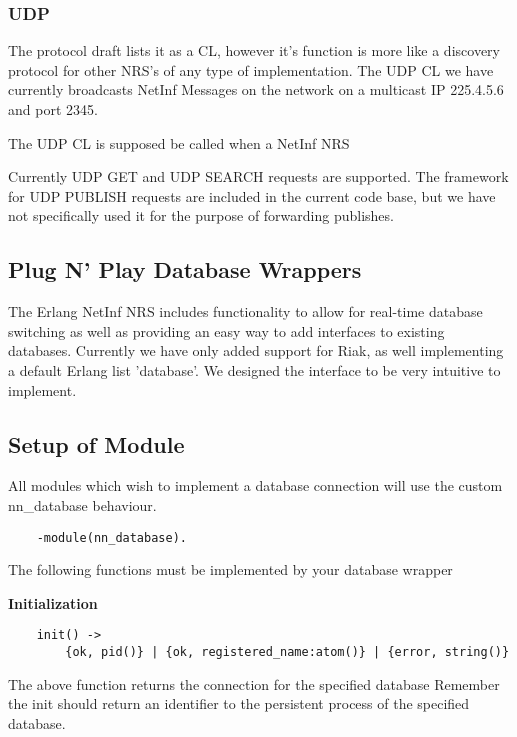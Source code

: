 \documentclass[11pt]{report}
\begin{document}
\subsubsection{UDP}

The protocol draft lists it as a CL, however it's function is more like a discovery protocol for other NRS's of any type of implementation. The UDP CL we have currently broadcasts NetInf Messages on the network on a multicast IP 225.4.5.6 and port 2345. 

The UDP CL is supposed be called when a NetInf NRS 

Currently UDP GET and UDP SEARCH requests are supported. The framework for UDP PUBLISH requests are included in the current code base, but we have not specifically used it for the purpose of forwarding publishes. 


\subsection {Plug N' Play Database Wrappers}

The Erlang NetInf NRS includes functionality to allow for real-time database switching as well as providing an easy way to add interfaces to existing databases. Currently we have only added support for Riak, as well implementing a default Erlang list 'database'.  We designed the interface to be very intuitive to implement.

\subsection {Setup of Module}

All modules which wish to implement a database connection will use the custom nn\_database behaviour.

\begin {verbatim}
    -module(nn_database).
\end{verbatim}

The following functions must be implemented by your database wrapper

\textbf{Initialization}

\begin {verbatim}
    init() -> 
    	{ok, pid()} | {ok, registered_name:atom()} | {error, string()}
\end{verbatim}

The above function returns the connection for the specified database
Remember the init should return an identifier to the persistent process of the specified database.
\end{document}
